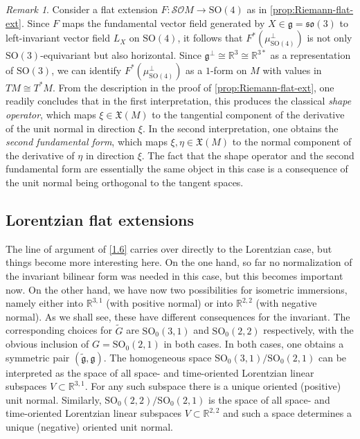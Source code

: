\documentclass[british,11pt,a4paper]{amsart}
\numberwithin{equation}{section}
\renewcommand\frak{\mathfrak}
\newcommand\Cal{\mathcal}
\newcommand{\tfg}{\widetilde{\mathfrak g}}
\newcommand*{\R}{\mathbb{R}}
\newcommand{\col}{:}
\newcounter{theorem}
\numberwithin{theorem}{section}
\theoremstyle{definition}
\theoremstyle{remark}
\newtheorem{remark}[theorem]{Remark}
\begin{document}
\begin{remark}\label{rem:Rieman}
Consider a flat extension $F\col\Cal{SO}M\to \mathrm{SO}(4)$ as in
\cref{prop:Riemann-flat-ext}. Since $F$ maps the fundamental vector field generated
by $X\in\frak{g}=\mathfrak{so}(3)$ to left-invariant vector field $L_X$ on
$\mathrm{SO}(4)$, it follows that $F^*(\mu_{\mathrm{SO}(4)}^\perp)$ is not only
$\mathrm{SO}(3)$-equivariant but also horizontal. Since
$\frak{g}^\perp\cong\R^3\cong\R^{3*}$ as a representation of $\mathrm{SO}(3)$, we can
identify $F^*(\mu_{\mathrm{SO}(4)}^\perp)$ as a $1$-form on $M$ with values in
$TM\cong T^*M$. From the description in the proof of \cref{prop:Riemann-flat-ext},
one readily concludes that in the first interpretation, this produces the classical
\textit{shape operator}, which maps $\xi\in\frak{X}(M)$ to the tangential component
of the derivative of the unit normal in direction $\xi$. In the second
interpretation, one obtains the \textit{second fundamental form}, which maps
$\xi,\eta\in\frak{X}(M)$ to the normal component of the derivative of $\eta$ in
direction $\xi$. The fact that the shape operator and the second fundamental form are
essentially the same object in this case is a consequence of the unit normal being
orthogonal to the tangent spaces.
\end{remark}

\subsection{Lorentzian flat extensions}\label{1.7}
The line of argument of \cref{1.6} carries over directly to the Lorentzian case, but
things become more interesting here. On the one hand, so far no normalization of the
invariant bilinear form was needed in this case, but this becomes important now. On
the other hand, we have now two possibilities for isometric immersions, namely either
into $\mathbb R^{3,1}$ (with positive normal) or into $\mathbb R^{2,2}$ (with
negative normal). As we shall see, these have different consequences for the
invariant. The corresponding choices for $\tilde G$ are $\mathrm{SO}_0(3,1)$ and
$\mathrm{SO}_0(2,2)$ respectively, with the obvious inclusion of
$G=\mathrm{SO}_0(2,1)$ in both cases. In both cases, one obtains a symmetric pair
$(\tfg,\frak{g})$. The homogeneous space $\mathrm{SO}_0(3,1)/\mathrm{SO}_0(2,1)$ can
be interpreted as the space of all space- and time-oriented Lorentzian linear
subspaces $V\subset\R^{3,1}$. For any such subspace there is a unique oriented
(positive) unit normal. Similarly, $\mathrm{SO}_0(2,2)/\mathrm{SO}_0(2,1)$ is the
space of all space- and time-oriented Lorentzian linear subspaces $V\subset\R^{2,2}$
and such a space determines a unique (negative) oriented unit normal.
\end{document}

